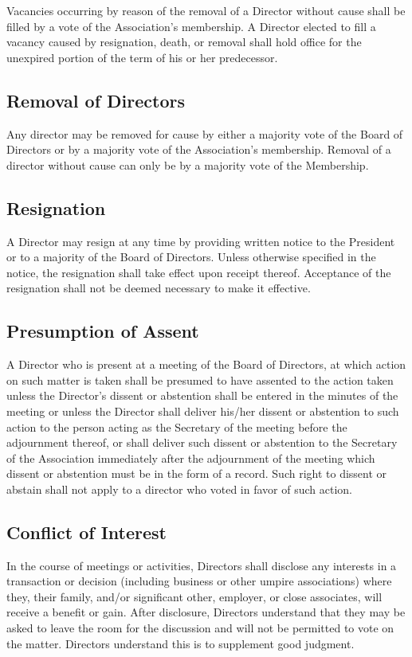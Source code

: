 \documentclass[letterpaper,11pt]{article}
\begin{document}
Vacancies occurring by reason of the removal of a Director without cause shall be filled by a vote of the Association's membership. A Director elected to fill a vacancy caused by resignation, death, or removal shall hold office for the unexpired portion of the term of his or her predecessor.
\subsection{Removal of Directors}
Any director may be removed for cause by either a majority vote of the Board of Directors or by a majority vote of the Association's membership. Removal of a director without cause can only be by a majority vote of the Membership.
\subsection{Resignation}
A Director may resign at any time by providing written notice to the President or to a majority of the Board of Directors. Unless otherwise specified in the notice, the resignation shall take effect upon receipt thereof. Acceptance of the resignation shall not be deemed necessary to make it effective.
\subsection{Presumption of Assent}
A Director who is present at a meeting of the Board of Directors, at which action on such matter is taken shall be presumed to have assented to the action taken unless the Director's dissent or abstention shall be entered in the minutes of the meeting or unless the Director shall deliver his/her dissent or abstention to such action to the person acting as the Secretary of the meeting before the adjournment thereof, or shall deliver such dissent or abstention to the Secretary of the Association immediately after the adjournment of the meeting which dissent or abstention must be in the form of a record.
Such right to dissent or abstain shall not apply to a director who voted in favor of such action.
\subsection{Conflict of Interest}
In the course of meetings or activities, Directors shall disclose any interests in a transaction or decision (including business or other umpire associations) where they, their family, and/or significant other, employer, or close associates, will receive a benefit or gain. After disclosure, Directors understand that they may be asked to leave the room for the discussion and will not be permitted to vote on the matter. Directors understand this is to supplement good judgment.
\end{document}
